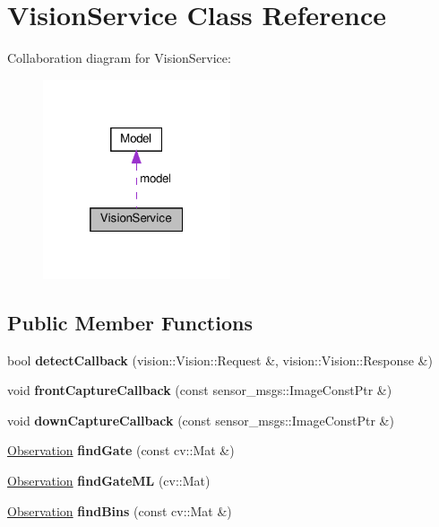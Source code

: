 \hypertarget{classVisionService}{}\section{Vision\+Service Class Reference}
\label{classVisionService}


Collaboration diagram for Vision\+Service\+:\nopagebreak
\begin{figure}[H]
\begin{center}
\leavevmode
\includegraphics[width=157pt]{classVisionService__coll__graph}
\end{center}
\end{figure}
\subsection*{Public Member Functions}
\begin{DoxyCompactItemize}
\item 
\mbox{\label{classVisionService_a40b83115dc945cfa9ed16fdfa3c99ba5}} 
bool {\bfseries detect\+Callback} (vision\+::\+Vision\+::\+Request \&, vision\+::\+Vision\+::\+Response \&)
\item 
\mbox{\label{classVisionService_ae629573b0360b177650972208d80e961}} 
void {\bfseries front\+Capture\+Callback} (const sensor\+\_\+msgs\+::\+Image\+Const\+Ptr \&)
\item 
\mbox{\label{classVisionService_a604bddf91a9a712bcc4edd1929e49b25}} 
void {\bfseries down\+Capture\+Callback} (const sensor\+\_\+msgs\+::\+Image\+Const\+Ptr \&)
\item 
\mbox{\label{classVisionService_a1395f4513469c69074c2f7e16da68c13}} 
\hyperlink{structObservation}{Observation} {\bfseries find\+Gate} (const cv\+::\+Mat \&)
\item 
\mbox{\label{classVisionService_aa294fde48d52b528ca2082910f7cce2f}} 
\hyperlink{structObservation}{Observation} {\bfseries find\+Gate\+ML} (cv\+::\+Mat)
\item 
\mbox{\label{classVisionService_aedfc6ebed6b051551441b5476e5318c3}} 
\hyperlink{structObservation}{Observation} {\bfseries find\+Bins} (const cv\+::\+Mat \&)
\end{DoxyCompactItemize}
